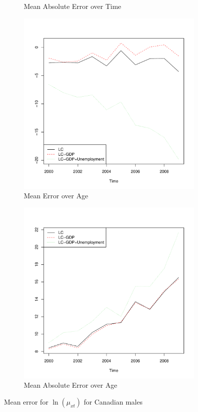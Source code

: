 \documentclass[AER, draftmode]{AEA}
\begin{document}
\begin{figure}[!htp]
\begin{subfigure}{0.4\textwidth}
		\caption{Mean Absolute Error over Time}
		\label{fig:prederrorb}
	\end{subfigure}
	\begin{subfigure}{0.4\textwidth}
		\includegraphics[width=\linewidth]{CAN_pred_error_time_male} 
		\caption{Mean Error over Age}
		\label{fig:prederrorc}
	\end{subfigure}
	\begin{subfigure}{0.4\textwidth}
		\includegraphics[width=\linewidth]{CAN_abs_pred_error_time_male} 
		\caption{Mean Absolute Error over Age}
		\label{fig:prederrord}
	\end{subfigure}
	\caption{Mean error for $\ln(\mu_{xt})$ for Canadian males}
\end{figure}
\end{document}
